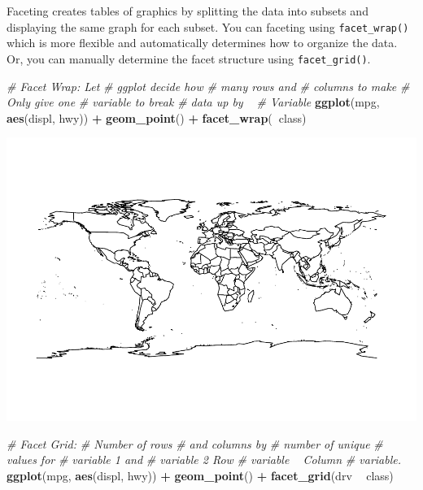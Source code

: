 \documentclass[
]{book}
\newenvironment{Shaded}{\begin{snugshade}}{\end{snugshade}}
\newcommand{\CommentTok}[1]{\textcolor[rgb]{0.56,0.35,0.01}{\textit{#1}}}
\newcommand{\KeywordTok}[1]{\textcolor[rgb]{0.13,0.29,0.53}{\textbf{#1}}}
\newcommand{\NormalTok}[1]{#1}
\newcommand{\OperatorTok}[1]{\textcolor[rgb]{0.81,0.36,0.00}{\textbf{#1}}}
\newcommand{\StringTok}[1]{\textcolor[rgb]{0.31,0.60,0.02}{#1}}
\begin{document}
Faceting creates tables of graphics by splitting the data into subsets and displaying the same graph for each subset. You can faceting using \texttt{facet\_wrap()} which is more flexible and automatically determines how to organize the data. Or, you can manually determine the facet structure using \texttt{facet\_grid()}.

\begin{Shaded}
\begin{Highlighting}[]
\CommentTok{# Facet Wrap: Let}
\CommentTok{# ggplot decide how}
\CommentTok{# many rows and}
\CommentTok{# columns to make}
\CommentTok{# Only give one}
\CommentTok{# variable to break}
\CommentTok{# data up by ~}
\CommentTok{# Variable}
\KeywordTok{ggplot}\NormalTok{(mpg, }\KeywordTok{aes}\NormalTok{(displ,}
\NormalTok{    hwy)) }\OperatorTok{+}\StringTok{ }\KeywordTok{geom_point}\NormalTok{() }\OperatorTok{+}
\StringTok{    }\KeywordTok{facet_wrap}\NormalTok{(}\OperatorTok{~}\NormalTok{class)}
\end{Highlighting}
\end{Shaded}

\includegraphics{_main_files/figure-latex/unnamed-chunk-255-1.pdf}

\begin{Shaded}
\begin{Highlighting}[]
\CommentTok{# Facet Grid:}
\CommentTok{# Number of rows}
\CommentTok{# and columns by}
\CommentTok{# number of unique}
\CommentTok{# values for}
\CommentTok{# variable 1 and}
\CommentTok{# variable 2 Row}
\CommentTok{# variable ~ Column}
\CommentTok{# variable.}
\KeywordTok{ggplot}\NormalTok{(mpg, }\KeywordTok{aes}\NormalTok{(displ,}
\NormalTok{    hwy)) }\OperatorTok{+}\StringTok{ }\KeywordTok{geom_point}\NormalTok{() }\OperatorTok{+}
\StringTok{    }\KeywordTok{facet_grid}\NormalTok{(drv }\OperatorTok{~}
\StringTok{        }\NormalTok{class)}
\end{Highlighting}
\end{Shaded}
\end{document}
